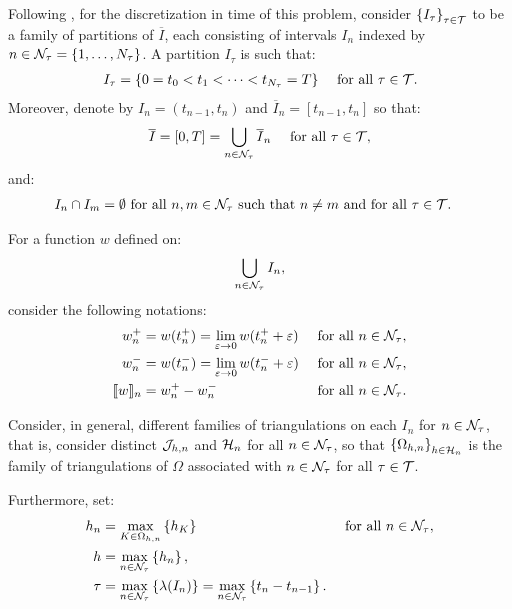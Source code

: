 Following \cite{Feistauer2007}, for the discretization in time of this problem, consider $\left\{ I_{\tau} \right\}_{\tau \in \mathcal{T}}$ to be a family of partitions of $\overline{I}$, each consisting of intervals $I_n$ indexed by $n \in \mathcal{N}_{\tau} = \left\{ 1, \dots, N_{\tau} \right\}$. A partition $I_{\tau}$ is such that:
\begin{align}
    I_{\tau} &= \left\{ 0 = t_0 < t_1 < \dots < t_{N_\tau} = T \right\} &\text{ for all } \tau \in \mathcal{T}.
\end{align}
Moreover, denote by $I_n = \left( t_{n - 1}, t_n \right)$ and $\overline{I}_n = \left[ t_{n - 1}, t_n \right]$ so that:
\begin{align}
    \overline{I} &= \left[ 0, T \right] = \bigcup_{n \in \mathcal{N}_{\tau}} \overline{I}_n &\text{ for all } \tau \in \mathcal{T},
\end{align}
and:
\begin{align}
    I_n \cap I_m = \emptyset &\text{ for all } n, m \in \mathcal{N}_{\tau} \text{ such that } n \neq m \text{ and for all } \tau \in \mathcal{T}.
\end{align}

For a function $w$ defined on:
\begin{align}
    \bigcup_{n \in \mathcal{N}_{\tau}} I_n,
\end{align}
consider the following notations:
\begin{align} %
    w_n^+ &= w(t_n^+) = \lim_{\varepsilon \rightarrow 0} w(t_n^+ + \varepsilon) &\text{ for all } n \in \TimeIndices, \\
    w_n^- &= w(t_n^-) = \lim_{\varepsilon \rightarrow 0} w(t_n^- + \varepsilon) &\text{ for all } n \in \TimeIndices, \\
    \Jump{w}_n &= w_n^+ - w_n^- &\text{ for all } n \in \TimeIndices.
\end{align}

Consider, in general, different families of triangulations on each $I_n$ for $n \in \mathcal{N}_{\tau}$, that is, consider distinct $\mathcal{J}_{h, n}$ and $\mathcal{H}_n$ for all $n \in \mathcal{N}_{\tau}$, so that $\left\{ \Omega_{h, n} \right\}_{h \in \mathcal{H}_n}$ is the family of triangulations of $\Omega$ associated with $n \in \mathcal{N}_{\tau}$ for all $\tau \in \mathcal{T}$.

Furthermore, set:
\begin{align}
    h_n &= \max_{K \in \Omega_{h, n}} \left\{ h_K \right\} &\text{ for all } n \in \mathcal{N}_{\tau}, \\
    h &= \max_{n \in \mathcal{N}_{\tau}} \left\{ h_n \right\}, \\
    \tau &= \max_{n \in \mathcal{N}_{\tau}} \left\{ \lambda(I_n) \right\} = \max_{n \in \mathcal{N}_{\tau}} \left\{ t_n - t_{n - 1} \right\}.
\end{align}

